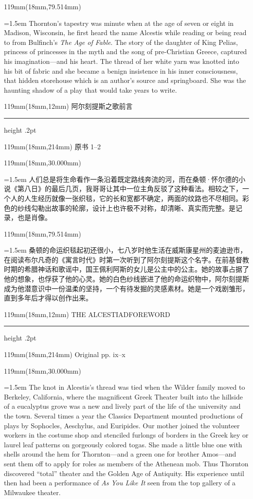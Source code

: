 \documentclass{article}
\newcommand{\ENsetup}{\normalfont\color{ink}\fontsize{11}{16.5}\selectfont\emergencystretch=1.5em}
\newcommand{\ZHsetup}{\normalfont\color{ink}\fontsize{10.5}{17}\selectfont\emergencystretch=1.5em}
\newcommand{\Block}[3]{\begin{textblock*}{119mm}(18mm,#1mm){#2 #3\par}\end{textblock*}}
\newcommand{\Heading}[3]{%
  \begin{textblock*}{119mm}(18mm,12mm)
    \color{quiet}\fontsize{7.5}{10}\selectfont
    #1\hfill #2\par\vspace{3mm}\hrule height .2pt
  \end{textblock*}
  \begin{textblock*}{119mm}(18mm,214mm)
    \color{quiet}\fontsize{7}{10}\selectfont #3\hfill\thepage
  \end{textblock*}
}
\begin{document}
\Block{79.514}{\ENsetup}{Thornton's tapestry was minute when at the age of seven or eight in Madison, Wisconsin, he first heard the name Alcestis while reading or being read to from Bulfinch's \textit{The Age of Fable}. The story of the daughter of King Pelias, princess of princesses in the myth and the song of pre-Christian Greece, captured his imagination—and his heart. The thread of her white yarn was knotted into his bit of fabric and she became a benign insistence in his inner consciousness, that hidden storehouse which is an author's source and springboard. She was the haunting shadow of a play that would take years to write.\par}
\newpage
\null
\Heading{阿尔刻提斯之歌}{前言}{原书 1–2}
\Block{30.000}{\ZHsetup}{人们总是将生命看作一条沿着既定路线奔流的河，而在桑顿·怀尔德的小说《第八日》的最后几页，我哥哥让其中一位主角反驳了这种看法。相较之下，一个人的人生经历就像一张织毯，它的长和宽都不确定，两面的纹路也不尽相同。彩色的纱线勾勒出故事的轮廓，设计上也许极不对称，却清晰、真实而完整。是记录，也是肖像。\par }
\Block{79.514}{\ZHsetup}{桑顿的命运织毯起初还很小，七八岁时他生活在威斯康星州的麦迪逊市，在阅读布尔凡奇的《寓言时代》时第一次听到了阿尔刻提斯这个名字。在前基督教时期的希腊神话和歌谣中，国王佩利阿斯的女儿是公主中的公主。她的故事占据了他的想象，也俘获了他的心灵。她的白色纱线嵌进了他的命运织物中，阿尔刻提斯成为他潜意识中一份温柔的坚持，一个有待发掘的灵感素材。她是一个戏剧雏形，直到多年后才得以创作出来。\par }
\newpage
\null
\Heading{THE ALCESTIAD}{FOREWORD}{Original pp. ix–x}
\Block{30.000}{\ENsetup}{The knot in Alcestis's thread was tied when the Wilder family moved to Berkeley, California, where the magnificent Greek Theater built into the hillside of a eucalyptus grove was a new and lively part of the life of the university and the town. Several times a year the Classics Department mounted productions of plays by Sophocles, Aeschylus, and Euripides. Our mother joined the volunteer workers in the costume shop and stenciled furlongs of borders in the Greek key or laurel leaf patterns on gorgeously colored togas. She made a little blue one with shells around the hem for Thornton—and a green one for brother Amos—and sent them off to apply for roles as members of the Athenean mob. Thus Thornton discovered ``total'' theater and the Golden Age of Antiquity. His experience until then had been a performance of \textit{As You Like It} seen from the top gallery of a Milwaukee theater.\par}
\end{document}
